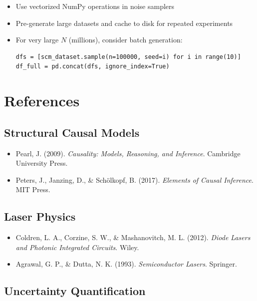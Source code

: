 \documentclass[11pt,a4paper]{article}
\begin{document}
\begin{itemize}
    \item Use vectorized NumPy operations in noise samplers
    \item Pre-generate large datasets and cache to disk for repeated experiments
    \item For very large $N$ (millions), consider batch generation:
\begin{lstlisting}
dfs = [scm_dataset.sample(n=100000, seed=i) for i in range(10)]
df_full = pd.concat(dfs, ignore_index=True)
\end{lstlisting}
\end{itemize}

\section{References}

\subsection{Structural Causal Models}

\begin{itemize}
    \item Pearl, J. (2009). \emph{Causality: Models, Reasoning, and Inference}. Cambridge University Press.
    \item Peters, J., Janzing, D., \& Schölkopf, B. (2017). \emph{Elements of Causal Inference}. MIT Press.
\end{itemize}

\subsection{Laser Physics}

\begin{itemize}
    \item Coldren, L. A., Corzine, S. W., \& Mashanovitch, M. L. (2012). \emph{Diode Lasers and Photonic Integrated Circuits}. Wiley.
    \item Agrawal, G. P., \& Dutta, N. K. (1993). \emph{Semiconductor Lasers}. Springer.
\end{itemize}

\subsection{Uncertainty Quantification}
\end{document}
